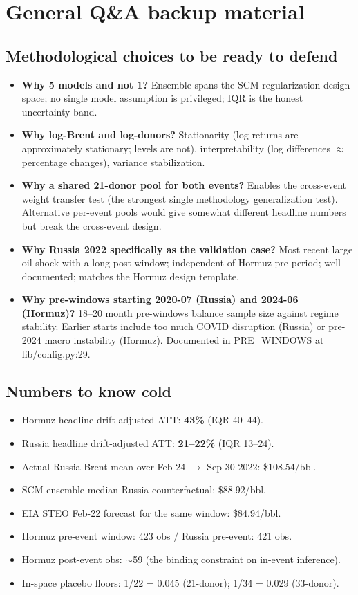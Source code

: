 \documentclass[11pt,a4paper]{article}
\begin{document}
\section*{General Q\&A backup material}

\subsection{Methodological choices to be ready to defend}
\begin{itemize}
  \item \textbf{Why 5 models and not 1?} Ensemble spans the SCM regularization design space; no single model assumption is privileged; IQR is the honest uncertainty band.
  \item \textbf{Why log-Brent and log-donors?} Stationarity (log-returns are approximately stationary; levels are not), interpretability (log differences $\approx$ percentage changes), variance stabilization.
  \item \textbf{Why a shared 21-donor pool for both events?} Enables the cross-event weight transfer test (the strongest single methodology generalization test). Alternative per-event pools would give somewhat different headline numbers but break the cross-event design.
  \item \textbf{Why Russia 2022 specifically as the validation case?} Most recent large oil shock with a long post-window; independent of Hormuz pre-period; well-documented; matches the Hormuz design template.
  \item \textbf{Why pre-windows starting 2020-07 (Russia) and 2024-06 (Hormuz)?} 18--20 month pre-windows balance sample size against regime stability. Earlier starts include too much COVID disruption (Russia) or pre-2024 macro instability (Hormuz). Documented in PRE\_WINDOWS at lib/config.py:29.
\end{itemize}

\subsection{Numbers to know cold}
\begin{itemize}
  \item Hormuz headline drift-adjusted ATT: \textbf{43\%} (IQR 40--44).
  \item Russia headline drift-adjusted ATT: \textbf{21--22\%} (IQR 13--24).
  \item Actual Russia Brent mean over Feb 24 $\to$ Sep 30 2022: \$108.54/bbl.
  \item SCM ensemble median Russia counterfactual: \$88.92/bbl.
  \item EIA STEO Feb-22 forecast for the same window: \$84.94/bbl.
  \item Hormuz pre-event window: 423 obs / Russia pre-event: 421 obs.
  \item Hormuz post-event obs: $\sim$59 (the binding constraint on in-event inference).
  \item In-space placebo floors: 1/22 = 0.045 (21-donor); 1/34 = 0.029 (33-donor).
\end{itemize}
\end{document}
